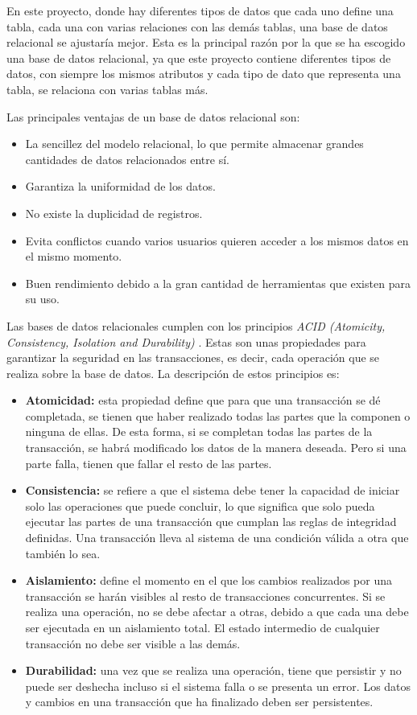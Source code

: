  En este proyecto, donde hay diferentes tipos de datos que cada uno define una tabla, cada una con varias relaciones con las demás tablas, una base de datos relacional se ajustaría mejor. Esta es la principal razón por la que se ha escogido una base de datos relacional, ya que este proyecto contiene diferentes tipos de datos, con siempre los mismos atributos y cada tipo de dato que representa una tabla, se relaciona con varias tablas más.


Las principales ventajas de un base de datos relacional son:
\begin{itemize}
    \item La sencillez del modelo relacional, lo que permite almacenar grandes cantidades de datos relacionados entre sí.
     \item Garantiza la uniformidad de los datos.
      \item No existe la duplicidad de registros.
       \item Evita conflictos cuando varios usuarios quieren acceder a los mismos datos en el mismo momento.
        \item Buen rendimiento debido a la gran cantidad de herramientas que existen para su uso.
\end{itemize}

Las bases de datos relacionales cumplen con los principios \textit{ACID (Atomicity, Consistency, Isolation and Durability)} \cite{ACID}. Estas son unas propiedades para garantizar la seguridad en las transacciones, es decir, cada operación que se realiza sobre la base de datos. La descripción de estos principios es:
\begin{itemize}
    \item \textbf{Atomicidad:} esta propiedad define que para que una transacción se dé completada, se tienen que haber realizado todas las partes que la componen o ninguna de ellas. De esta forma, si se completan todas las partes de la transacción, se habrá modificado los datos de la manera deseada. Pero si una parte falla, tienen que fallar el resto de las partes.
    \item \textbf{Consistencia:} se refiere a que el sistema debe tener la capacidad de iniciar solo las operaciones que puede concluir, lo que significa que solo pueda ejecutar las partes de una transacción que cumplan las reglas de integridad definidas. Una transacción lleva al sistema de una condición válida a otra que también lo sea. 
    \item \textbf{Aislamiento:} define el momento en el que los cambios realizados por una transacción se harán visibles al resto de transacciones concurrentes. Si se realiza una operación, no se debe afectar a otras, debido a que cada una debe ser ejecutada en un aislamiento total. El estado intermedio de cualquier transacción no debe ser visible a las demás.
    \item \textbf{Durabilidad:} una vez que se realiza una operación, tiene que persistir y no puede ser deshecha incluso si el sistema falla o se presenta un error. Los datos y cambios en una transacción que ha finalizado deben ser persistentes.
\end{itemize}

